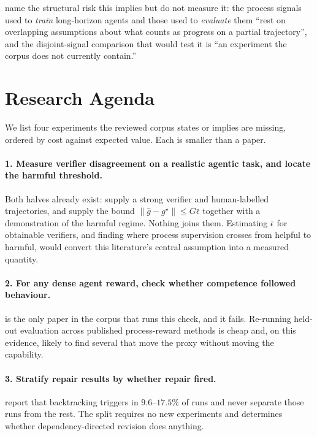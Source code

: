 \documentclass[10pt,twocolumn,a4paper]{article}
\newcommand{\ebar}{\bar{\epsilon}}
\begin{document}
\citet{chen2026horizongapplanningmemory} name the structural risk this implies but do not
measure it: the process signals used to \emph{train} long-horizon agents and those used to
\emph{evaluate} them ``rest on overlapping assumptions about what counts as progress on a
partial trajectory'', and the disjoint-signal comparison that would test it is ``an
experiment the corpus does not currently contain.''

\section{Research Agenda}
\label{sec:agenda}

We list four experiments the reviewed corpus states or implies are missing, ordered by
cost against expected value.
Each is smaller than a paper.

\paragraph{1. Measure verifier disagreement on a realistic agentic task, and locate the
harmful threshold.}
Both halves already exist:
\citet{rosset2026artbuildingverifierscomputer} supply a strong verifier and human-labelled
trajectories, and \citet{yuan2026verifiableprocessrewardsagentic} supply the bound
$\lVert \hat{g} - g^{\star} \rVert \le G\ebar$ together with a demonstration of the harmful
regime.
Nothing joins them.
Estimating $\ebar$ for obtainable verifiers, and finding where process supervision crosses
from helpful to harmful, would convert this literature's central assumption into a measured
quantity.

\paragraph{2. For any dense agent reward, check whether competence followed behaviour.}
\citet{fan2026screenshotstoolselicitingtool} is the only paper in the corpus that runs this
check, and it fails.
Re-running held-out evaluation across published process-reward methods is cheap and, on
this evidence, likely to find several that move the proxy without moving the capability.

\paragraph{3. Stratify repair results by whether repair fired.}
\citet{yang2026selfcorrectinglonghorizonsearchagents} report that backtracking triggers in
$9.6$--$17.5\%$ of runs and never separate those runs from the rest.
The split requires no new experiments and determines whether dependency-directed revision
does anything.
\end{document}
